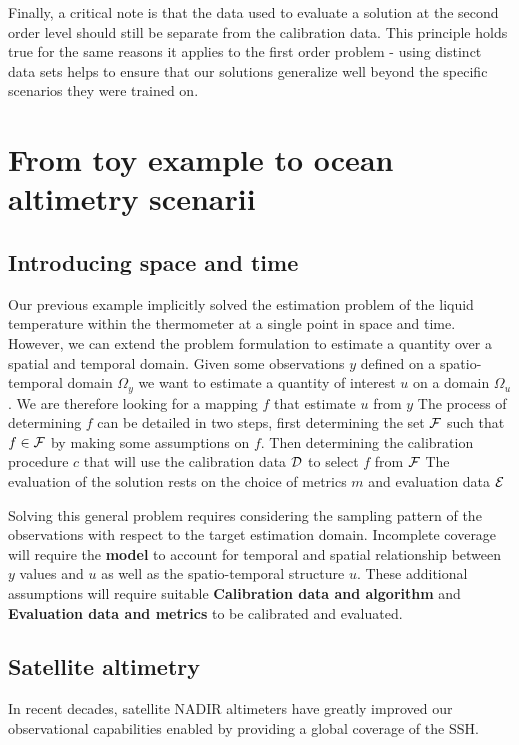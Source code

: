 \begin{bibunit}
Finally, a critical note is that the data used to evaluate a solution at the second order level should still be separate from the calibration data. This principle holds true for the same reasons it applies to the first order problem - using distinct data sets helps to ensure that our solutions generalize well beyond the specific scenarios they were trained on.

\section{From toy example to ocean altimetry scenarii}
\subsection*{Introducing space and time}
Our previous example implicitly solved the estimation problem of the liquid temperature within the thermometer at a single point in space and time.
However, we can extend the problem formulation to estimate a quantity over a spatial and temporal domain.
Given some observations $y$ defined on a spatio-temporal domain $\Omega_y$ we want to estimate a quantity of interest $u$ on a domain $\Omega_u$. We are therefore looking for a mapping $f$ that estimate $u$ from $y$
The process of determining $f$ can be detailed in two steps, first determining the set $\cal{F}$ such that $f \in \cal{F}$ by making some assumptions on $f$. Then determining the calibration procedure $c$ that will use the calibration data $\cal{D}$ to select $f$ from $\cal{F}$
The evaluation of the solution rests on the choice of metrics $m$ and evaluation data $\cal{E}$

Solving this general problem requires considering the sampling pattern of the observations with respect to the target estimation domain.
Incomplete coverage will require the \textbf{model} to account for temporal and spatial relationship between $y$ values and $u$ as well as the spatio-temporal structure $u$.
These additional assumptions will require suitable \textbf{Calibration data and algorithm} and \textbf{Evaluation data and metrics} to be calibrated and evaluated.



\subsection*{Satellite altimetry}


In recent decades, satellite NADIR altimeters have greatly improved our observational capabilities enabled by providing a global coverage of the SSH.


\end{bibunit}
